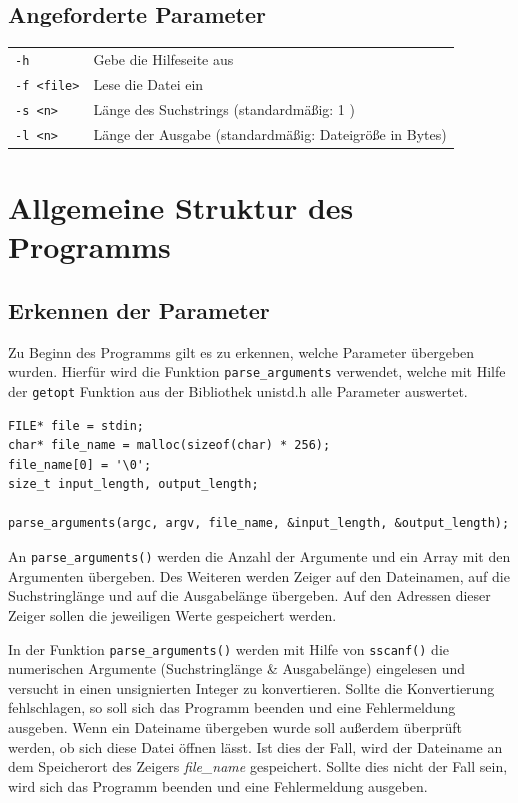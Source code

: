 \documentclass[10pt,a4paper]{article}
\begin{document}
\begin{spacing}{1}
\subsection{Angeforderte Parameter}
\begin{tabular}{ l l }
    \texttt{-h} & Gebe die Hilfeseite aus \\
    \texttt{-f <file>} & Lese die Datei ein \\
    \texttt{-s <n>} & Länge des Suchstrings (standardmäßig: 1 ) \\
    \texttt{-l <n>} & Länge der Ausgabe (standardmäßig: Dateigröße in Bytes) \\
\end{tabular}

\section{Allgemeine Struktur des Programms}
\subsection{Erkennen der Parameter}

Zu Beginn des Programms gilt es zu erkennen, welche Parameter übergeben wurden.
Hierfür wird die Funktion \texttt{parse\_arguments} verwendet, welche mit Hilfe
der \texttt{getopt} Funktion aus der Bibliothek unistd.h alle Parameter
auswertet.

\begin{lstlisting}
FILE* file = stdin;
char* file_name = malloc(sizeof(char) * 256);
file_name[0] = '\0';
size_t input_length, output_length;

parse_arguments(argc, argv, file_name, &input_length, &output_length);
\end{lstlisting}

An \texttt{parse\_arguments()} werden die Anzahl der Argumente und ein
Array mit den Argumenten übergeben. Des Weiteren werden Zeiger auf den
Dateinamen, auf die Suchstringlänge und auf die Ausgabelänge übergeben.
Auf den Adressen dieser Zeiger sollen die jeweiligen Werte gespeichert werden.

In der Funktion \texttt{parse\_arguments()} werden mit Hilfe von
\texttt{sscanf()} die numerischen Argumente (Suchstringlänge \& Ausgabelänge)
eingelesen und versucht in einen unsignierten Integer zu konvertieren.
Sollte die Konvertierung fehlschlagen, so soll sich das Programm beenden und eine
Fehlermeldung ausgeben. Wenn ein Dateiname übergeben wurde soll außerdem überprüft werden, ob sich diese
Datei öffnen lässt. Ist dies der Fall, wird der Dateiname an dem
Speicherort des Zeigers {\it file\_name \/} gespeichert. Sollte dies nicht der
Fall sein, wird sich das Programm beenden und eine Fehlermeldung ausgeben.


\end{spacing}
\end{document}
